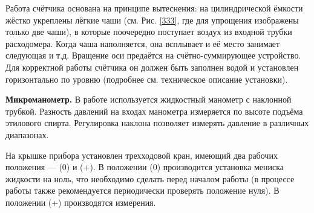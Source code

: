 \documentclass[a4paper, 12pt]{article}
\begin{document}
Работа счётчика основана на принципе вытеснения: на цилиндрической ёмкости жёстко
укреплены лёгкие чаши (см. Рис. \ref{333}, где для
упрощения изображены только две чаши), в которые поочередно поступает воздух из входной
трубки расходомера. Когда чаша наполняется,
она всплывает и её место занимает следующая
и т.д. Вращение оси предаётся на счётно-суммирующее устройство.
Для корректной работы счётчика он должен
быть заполнен водой и установлен горизонтально по уровню (подробнее см. техническое
описание установки).

\textbf{Микроманометр.} В работе используется жидкостный манометр с наклонной трубкой. Разность давлений на входах манометра измеряется по высоте
подъёма этилового спирта. Регулировка
наклона позволяет измерять давление в различных диапазонах.

На крышке прибора установлен трехходовой кран, имеющий два рабочих
положения — (0) и (+). В положении (0) производится установка мениска жидкости на ноль, что необходимо сделать перед началом работы (в процессе работы также рекомендуется периодически проверять положение нуля). В положении (+) производятся измерения.
\newpage
\end{document}
